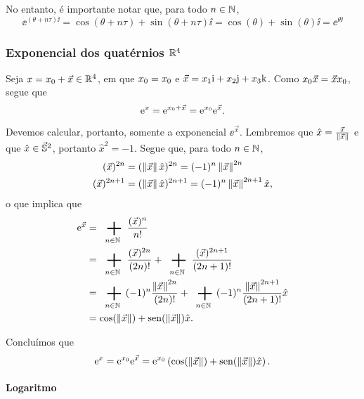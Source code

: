 No entanto, é importante notar que, para todo $n \in \N$,
	\begin{equation*}
	\ee^{(\theta+n\tau) \ii} = \cos(\theta+n\tau)+\sin(\theta+n\tau) \ii = \cos(\theta)+\sin(\theta) \ii = \ee^{\theta \ii}
	\end{equation*}

\subsubsection{Exponencial dos quatérnios $\R^4$}

Seja $x = \esc{x} + \vec{x} \in \R^4$, em que $\esc{x} = x_0$ e $\vec{x} = x_1 \ii + x_2 \jj + x_3 \kk$. Como $\esc{x}\vec{x} = \vec{x}\esc{x}$, segue que
	\begin{equation*}
	\ee^{x} = \ee^{\esc{x}+\vec{x}} = \ee^{\esc{x}}\ee^{\vec{x}}.
	\end{equation*}

Devemos calcular, portanto, somente a exponencial $\ee^{\vec{x}}$. Lembremos que $\hat{x} = \frac{\vec{x}}{\nor{\vec{x}}}$ e que $\hat{x} \in \vec{\S}^2$, portanto $\hat{x}^2 = -1$. Segue que, para todo $n \in \N$,
	\begin{align*}
	(\vec{x})^{2n} &= (\nor{\vec{x}} \hat{x})^{2n} = (-1)^n \nor{\vec{x}}^{2n} \\
	(\vec{x})^{2n+1} &= (\nor{\vec{x}} \hat{x})^{2n+1} = (-1)^n \nor{\vec{x}}^{2n+1}\hat{x},
	\end{align*}
o que implica que
	\begin{align*}
	\ee^{\vec{x}} &= \sum_{n \in \N} \frac{(\vec{x})^n}{n!} \\
		&= \sum_{n \in \N} \frac{(\vec{x})^{2n}}{(2n)!} + \sum_{n \in \N} \frac{(\vec{x})^{2n+1}}{(2n+1)!} \\
		&= \sum_{n \in \N} (-1)^n \frac{\nor{\vec{x}}^{2n}}{(2n)!} + \sum_{n \in \N} (-1)^n \frac{\nor{\vec{x}}^{2n+1}}{(2n+1)!}\hat{x} \\
		&= \cos(\nor{\vec{x}}) + \sin(\nor{\vec{x}}) \hat{x}.
	\end{align*}

Concluímos que
	\begin{equation*}
		\ee^{x} = \ee^{\esc{x}}\ee^{\vec{x}} = \ee^{\esc{x}}\left( \cos(\nor{\vec{x}}) + \sin(\nor{\vec{x}}) \hat{x} \right).
	\end{equation*}

\paragraph{Logaritmo}

